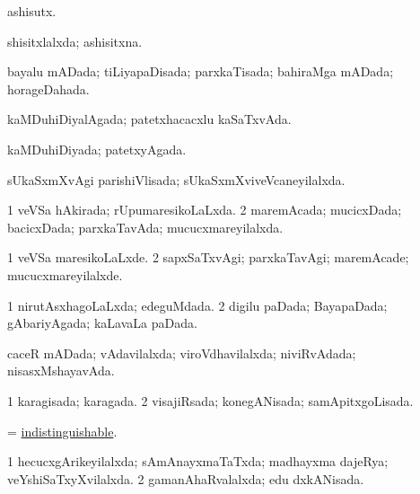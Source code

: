 \bentry
{} 
\gl{\nA}
\expl{}
\bmng
 ashisutx.\eng{ } 
\emng
\eentry

\bentry
{} 
\gl{\gu}
\expl{}
\bmng
 shisitxlalxda; ashisitxna. 
\emng
\eentry

\bentry
{} 
\gl{\gu}
\expl{}
\bmng
 bayalu mADada; tiLiyapaDisada; parxkaTisada; bahiraMga mADada; horageDahada. 
\emng
\eentry

\bentry
{} 
\gl{\gu}
\expl{}
\bmng
 kaMDuhiDiyalAgada; patetxhacacxlu kaSaTxvAda. 
\emng
\eentry

\bentry
{} 
\gl{\gu}
\expl{}
\bmng
 kaMDuhiDiyada; patetxyAgada. 
\emng
\eentry

\bentry
{} 
\gl{\gu}
\expl{}
\bmng
 sUkaSxmXvAgi parishiVlisada; sUkaSxmXviveVcaneyilalxda. 
\emng
\eentry

\bentry
{} 
\gl{\gu}
\expl{}
\bmng
\bnum
\num{1} veVSa hAkirada; rUpumaresikoLaLxda. 
\num{2} maremAcada; mucicxDada; bacicxDada; parxkaTavAda; mucucxmareyilalxda. 
\enum
\emng
\eentry

\bentry
{} 
\gl{\kirxvi}
\expl{}
\bmng
\bnum
\num{1} veVSa maresikoLaLxde. 
\num{2} sapxSaTxvAgi; parxkaTavAgi; maremAcade; mucucxmareyilalxde. 
\enum
\emng
\eentry

\bentry
{} 
\gl{\gu}
\expl{}
\bmng
\bnum
\num{1} nirutAsxhagoLaLxda; edeguMdada. 
\num{2} digilu paDada; BayapaDada; gAbariyAgada; kaLavaLa paDada. 
\enum
\emng
\eentry

\bentry
{} 
\gl{\gu}
\expl{}
\bmng
 caceR mADada; vAdavilalxda; viroVdhavilalxda; niviRvAdada; nisasxMshayavAda. 
\emng
\eentry

\bentry
{} 
\gl{\gu}
\expl{}
\bmng
\bnum
\num{1} karagisada; karagada. 
\num{2} visajiRsada; konegANisada; samApitxgoLisada. 
\enum
\emng
\eentry

\bentry
{} 
\gl{\gu}
\expl{}
\bmng
 = \hyperref{kandict_i.pdf}{I}{indistinguishable}{indistinguishable}. 
\emng
\eentry

\bentry
{} 
\gl{\gu}
\expl{}
\bmng
\bnum
\num{1} hecucxgArikeyilalxda; sAmAnayxmaTaTxda; madhayxma dajeRya; veYshiSaTxyXvilalxda. 
\num{2} gamanAhaRvalalxda; edu dxkANisada. 
\enum
\emng
\eentry

